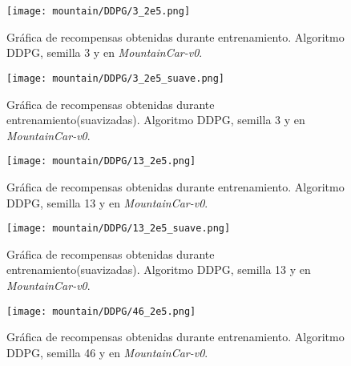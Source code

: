 \documentclass[11pt,fleqn]{book} %
\begin{document}
\begin{figure}[H]
	\centering\texttt{[image: mountain/DDPG/3\_2e5.png]}
	\caption{Gráfica de recompensas obtenidas durante entrenamiento. Algoritmo DDPG, semilla 3 y en \textit{MountainCar-v0}.}
	\label{fig:mountain13} %
\end{figure}

\begin{figure}[H]
	\centering\texttt{[image: mountain/DDPG/3\_2e5\_suave.png]}
	\caption{Gráfica de recompensas obtenidas durante entrenamiento(suavizadas). Algoritmo DDPG, semilla 3 y en \textit{MountainCar-v0}.}
	\label{fig:mountain14} %
\end{figure}

\begin{figure}[H]
	\centering\texttt{[image: mountain/DDPG/13\_2e5.png]}
	\caption{Gráfica de recompensas obtenidas durante entrenamiento. Algoritmo DDPG, semilla 13 y en \textit{MountainCar-v0}.}
	\label{fig:mountain15} %
\end{figure}

\begin{figure}[H]
	\centering\texttt{[image: mountain/DDPG/13\_2e5\_suave.png]}
	\caption{Gráfica de recompensas obtenidas durante entrenamiento(suavizadas). Algoritmo DDPG, semilla 13 y en \textit{MountainCar-v0}.}
	\label{fig:mountain16} %
\end{figure}

\begin{figure}[H]
	\centering\texttt{[image: mountain/DDPG/46\_2e5.png]}
	\caption{Gráfica de recompensas obtenidas durante entrenamiento. Algoritmo DDPG, semilla 46 y en \textit{MountainCar-v0}.}
	\label{fig:mountain17} %
\end{figure}
\end{document}
